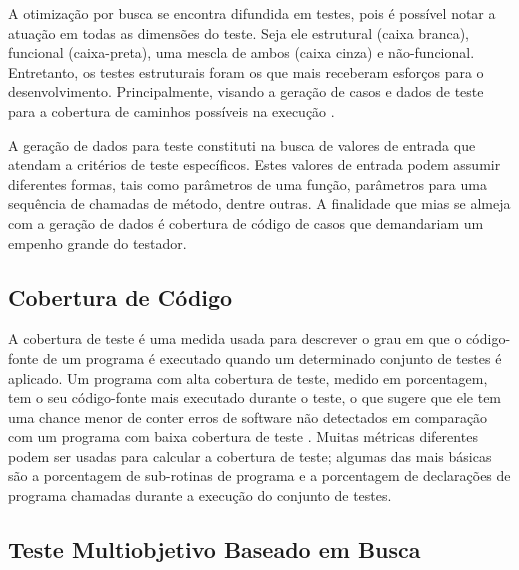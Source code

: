
A otimização por busca se encontra difundida em testes, pois é possível notar a atuação em todas as dimensões do teste. Seja ele estrutural (caixa branca), funcional (caixa-preta), uma mescla de ambos (caixa cinza) e não-funcional. Entretanto, os testes estruturais foram os que mais receberam esforços para o desenvolvimento. Principalmente, visando a geração de casos e dados de teste para a cobertura de caminhos possíveis na execução \cite{khari2017extensive}. 

A geração de dados para teste constituti na busca de valores de entrada que atendam a critérios de teste específicos. Estes valores de entrada podem assumir diferentes formas, tais como parâmetros de uma função, parâmetros para uma sequência de chamadas de método, dentre outras. A finalidade que mias se almeja com a geração de dados é cobertura de código de casos que demandariam um empenho grande do testador.

\subsection{Cobertura de Código}

A cobertura de teste é uma medida usada para descrever o grau em que o código-fonte de um programa é executado quando um determinado conjunto de testes é aplicado. Um programa com alta cobertura de teste, medido em porcentagem, tem o seu código-fonte mais executado durante o teste, o que sugere que ele tem uma chance menor de conter erros de software não detectados em comparação com um programa com baixa cobertura de teste \cite{yang2009survey}. Muitas métricas diferentes podem ser usadas para calcular a cobertura de teste; algumas das mais básicas são a porcentagem de sub-rotinas de programa e a porcentagem de declarações de programa chamadas durante a execução do conjunto de testes.

\subsection{Teste Multiobjetivo Baseado em Busca}

